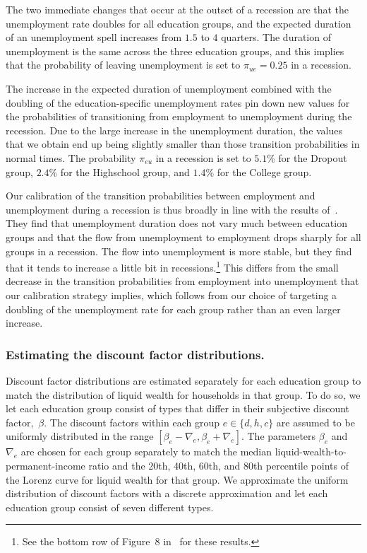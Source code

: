 \documentclass{econsocart}
\begin{document}
The two immediate changes that occur at the outset of a recession are that the unemployment rate doubles for all education groups, and the expected duration of an unemployment spell increases from $1.5$ to $4$ quarters. The duration of unemployment is the same across the three education groups, and this implies that the probability of leaving unemployment is set to $\pi_{ue} = 0.25$ in a recession.

The increase in the expected duration of unemployment combined with the doubling of the education-specific unemployment rates pin down new values for the probabilities of transitioning from employment to unemployment during the recession. Due to the large increase in the unemployment duration, the values that we obtain end up being slightly smaller than those transition probabilities in normal times. The probability $\pi_{eu}$ in a recession is set to $5.1\%$ for the Dropout group, $2.4\%$ for the Highschool group, and $1.4\%$ for the College group.

Our calibration of the transition probabilities between employment and unemployment during a recession is thus broadly in line with the results of~\cite{elsby2010labor}. They find that unemployment duration does not vary much between education groups and that the flow from unemployment to employment drops sharply for all groups in a recession. The flow into unemployment is more stable, but they find that it tends to increase a little bit in recessions.\footnote{See the bottom row of Figure~8 in~\cite{elsby2010labor} for these results.} This differs from the small decrease in the transition probabilities from employment into unemployment that our calibration strategy implies, which follows from our choice of targeting a doubling of the unemployment rate for each group rather than an even larger increase.



\subsubsection{Estimating the discount factor distributions.}
\whenintegrated{\label{sec:estimBetas}}

Discount factor distributions are estimated separately for each education group to match the distribution of liquid wealth for households in that group.
To do so, we let each education group consist of types that differ in their subjective discount factor,~$\beta$.
The discount factors within each group $e\in \{d, h, c\}$ are assumed to be uniformly distributed in the range $[\beta_e-\nabla_e, \beta_e+\nabla_e]$.
The parameters $\beta_e$ and $\nabla_e$ are chosen for each group separately to match the median liquid-wealth-to-permanent-income ratio and the 20th, 40th, 60th, and 80th percentile points of the Lorenz curve for liquid wealth for that group.
We approximate the uniform distribution of discount factors with a discrete approximation and let each education group consist of seven different types.
\end{document}
